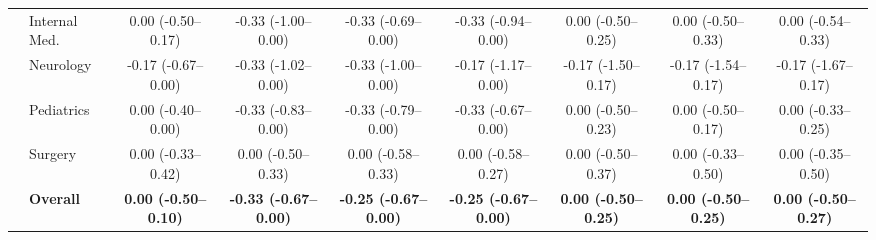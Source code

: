 \documentclass[10pt,journal,compsoc, onecolumn]{IEEEtran}
\begin{document}
\begin{table}[!htbp]
{\begin{tabular}{ll c @{\hskip 6pt} ccc @{\hskip 6pt} ccc}
& Internal Med. & 0.00 (-0.50--0.17) & -0.33 (-1.00--0.00) & -0.33 (-0.69--0.00) & -0.33 (-0.94--0.00) & 0.00 (-0.50--0.25) & 0.00 (-0.50--0.33) & 0.00 (-0.54--0.33) \\
& Neurology & -0.17 (-0.67--0.00) & -0.33 (-1.02--0.00) & -0.33 (-1.00--0.00) & -0.17 (-1.17--0.00) & -0.17 (-1.50--0.17) & -0.17 (-1.54--0.17) & -0.17 (-1.67--0.17) \\
& Pediatrics & 0.00 (-0.40--0.00) & -0.33 (-0.83--0.00) & -0.33 (-0.79--0.00) & -0.33 (-0.67--0.00) & 0.00 (-0.50--0.23) & 0.00 (-0.50--0.17) & 0.00 (-0.33--0.25) \\
& Surgery & 0.00 (-0.33--0.42) & 0.00 (-0.50--0.33) & 0.00 (-0.58--0.33) & 0.00 (-0.58--0.27) & 0.00 (-0.50--0.37) & 0.00 (-0.33--0.50) & 0.00 (-0.35--0.50) \\
\cmidrule{2-9}
& \textbf{Overall} & \textbf{0.00 (-0.50--0.10)} & \textbf{-0.33 (-0.67--0.00)} & \textbf{-0.25 (-0.67--0.00)} & \textbf{-0.25 (-0.67--0.00)} & \textbf{0.00 (-0.50--0.25)} & \textbf{0.00 (-0.50--0.25)} & \textbf{0.00 (-0.50--0.27)} \\
\bottomrule
\end{tabular}%
}
\end{table}


\clearpage          %
\vspace*{\fill}     %
\end{document}
